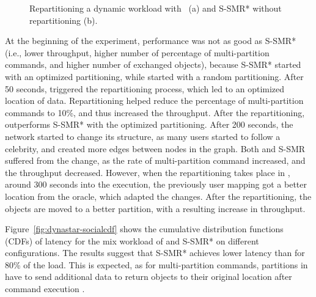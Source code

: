 \begin{figure}[ht!]
\begin{subfigure}{.48\textwidth}
    \caption{}
  \end{subfigure}
  \caption{Repartitioning a dynamic workload with \dynastar~(a) and S-SMR*
  without repartitioning (b).}%
  \label{fig:socialcelebrity}
\end{figure}

At the beginning of the experiment, \dynastar performance was not as good as
S-SMR* (i.e., lower throughput, higher number of percentage of multi-partition
commands, and higher number of exchanged objects), because S-SMR* started with
an optimized partitioning, while \dynastar started with a random partitioning.
After 50 seconds, \dynastar triggered the repartitioning process, which led to
an optimized location of data. Repartitioning helped reduce the percentage of
multi-partition commands to 10\%, and thus increased the throughput. After the
repartitioning, \dynastar outperforms S-SMR* with the optimized partitioning.
After 200 seconds, the network started to change its structure, as many users
started to follow a celebrity, and created more edges between nodes in the
graph. Both \dynastar and S-SMR suffered from the change, as the rate of
multi-partition command increased, and the throughput decreased. However, when
the repartitioning takes place in \dynastar, around 300 seconds into the
execution, the previously user mapping got a better location from the oracle,
which adapted the changes. After the repartitioning, the objects are moved to a
better partition, with a resulting increase in throughput.

Figure~\ref{fig:dynastar-socialcdf} shows the cumulative distribution functions
(CDFs) of latency for the mix workload of \dynastar and S-SMR* on different
configurations. The results suggest that S-SMR* achieves lower latency than
\dynastar for 80\% of the load. This is expected, as for multi-partition
commands, partitions in \dynastar have to send additional data to return objects
to their original location after command execution .

